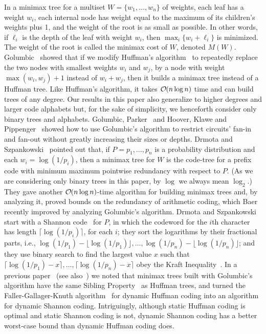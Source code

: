\documentclass[runningheads]{llncs}
\newcommand{\Oh}[1]
    {\ensuremath{\mathcal{O} \hspace{-.5ex} \left( {#1} \right)}}
\begin{document}
In a minimax tree for a multiset \(W = \{w_1, \ldots, w_n\}\) of weights, each leaf has a weight $w_i$, each internal node has weight equal to the maximum of its children's weights plus 1, and the weight of the root is as small as possible.  In other words, if $\ell_i$ is the depth of the leaf with weight $w_i$, then \(\max_i \{w_i + \ell_i\}\) is minimized.  The weight of the root is called the minimax cost of $W$, denoted \(M (W)\).  Golumbic~\cite{Gol76} showed that if we modify Huffman's algorithm~\cite{Huf52} to repeatedly replace the two nodes with smallest weights $w_i$ and $w_j$, by a node with weight \(\max (w_i, w_j) + 1\) instead of \(w_i + w_j\), then it builds a minimax tree instead of a Huffman tree.  Like Huffman's algorithm, it takes $\Oh{n \log n}$ time and can build trees of any degree.  Our results in this paper also generalize to higher degrees and larger code alphabets but, for the sake of simplicity, we henceforth consider only binary trees and alphabets.  Golumbic, Parker~\cite{Par79} and Hoover, Klawe and Pippenger~\cite{HKP84} showed how to use Golumbic's algorithm to restrict circuits' fan-in and fan-out without greatly increasing their sizes or depths.  Drmota and Szpankowski~\cite{DS02,DS04} pointed out that, if \(P = p_1, \ldots, p_n\) is a probability distribution and each \(w_i = \log (1 / p_i)\), then a minimax tree for $W$ is the code-tree for a prefix code with minimum maximum pointwise redundancy with respect to $P$.  (As we are considering only binary trees in this paper, by $\log$ we always mean $\log_2$.)  They gave another $\Oh{n \log n}$-time algorithm for building minimax trees and, by analyzing it, proved bounds on the redundancy of arithmetic coding, which Baer~\cite{Bae08} recently improved by analyzing Golumbic's algorithm.  Drmota and Szpankowski start with a \mbox{Shannon} code~\cite{Sha48} for $P$, in which the codeword for the $i$th character has length \(\lceil \log (1 / p_i) \rceil\), for each $i$; they sort the logarithms by their fractional parts, i.e., \(\log (1 / p_1) - \lfloor \log (1 / p_1) \rfloor, \ldots, \log (1 / p_n) - \lfloor \log (1 / p_n) \rfloor\); and they use binary search to find the largest value $x$ such that \(\lceil \log (1 / p_1) - x \rceil, \ldots, \lceil \log (1 / p_n) - x \rceil\) obey the Kraft Inequality~\cite{Kra49}.  In a previous paper~\cite{Gag04} (see also~\cite{Gag07,KN??}) we noted that minimax trees built with Golumbic's algorithm have the same Sibling Property~\cite{Fal73,Gal78} as Huffman trees, and turned the Faller-Gallager-Knuth algorithm~\cite{Knu85} for dynamic Huffman coding into an algorithm for dynamic Shannon coding.  Intriguingly, although static Huffman coding is optimal and static Shannon coding is not, dynamic Shannon coding has a better worst-case bound than dynamic Huffman coding does.
\end{document}
